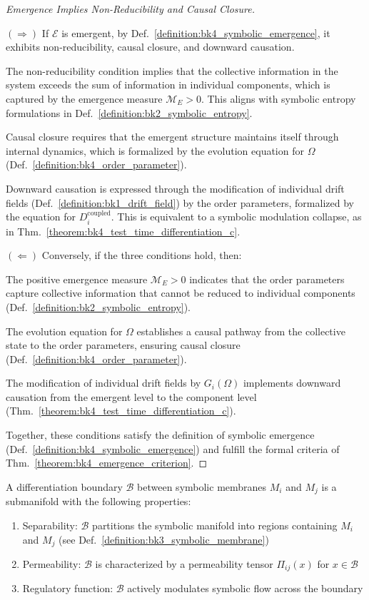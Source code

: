 \begin{proof}[Emergence Implies Non-Reducibility and Causal Closure]
\label{proof:bk4_emergence_conditions}
\leavevmode

$(\Rightarrow)$ If $\mathcal{E}$ is emergent, by Def.~\ref{definition:bk4_symbolic_emergence}, it exhibits non-reducibility, causal closure, and downward causation.

The non-reducibility condition implies that the collective information in the system exceeds the sum of information in individual components, which is captured by the emergence measure $\mathcal{M}_E > 0$.
This aligns with symbolic entropy formulations in Def.~\ref{definition:bk2_symbolic_entropy}.

Causal closure requires that the emergent structure maintains itself through internal dynamics, which is formalized by the evolution equation for $\Omega$ (Def.~\ref{definition:bk4_order_parameter}).

Downward causation is expressed through the modification of individual drift fields (Def.~\ref{definition:bk1_drift_field}) by the order parameters, formalized by the equation for $D_i^{\text{coupled}}$.
This is equivalent to a symbolic modulation collapse, as in Thm.~\ref{theorem:bk4_test_time_differentiation_c}.

$(\Leftarrow)$ Conversely, if the three conditions hold, then:

The positive emergence measure $\mathcal{M}_E > 0$ indicates that the order parameters capture collective information that cannot be reduced to individual components (Def.~\ref{definition:bk2_symbolic_entropy}).

The evolution equation for $\Omega$ establishes a causal pathway from the collective state to the order parameters, ensuring causal closure (Def.~\ref{definition:bk4_order_parameter}).

The modification of individual drift fields by $G_i(\Omega)$ implements downward causation from the emergent level to the component level (Thm.~\ref{theorem:bk4_test_time_differentiation_c}).

Together, these conditions satisfy the definition of symbolic emergence (Def.~\ref{definition:bk4_symbolic_emergence}) and fulfill the formal criteria of Thm.~\ref{theorem:bk4_emergence_criterion}.

\end{proof}
\begin{definition} \label{definition:bk4_differentiation_boundary}
A differentiation boundary $\mathcal{B}$ between symbolic membranes $M_i$ and $M_j$ is a submanifold with the following properties:
\begin{enumerate}
    \item Separability: $\mathcal{B}$ partitions the symbolic manifold into regions containing $M_i$ and $M_j$ (see Def.~\ref{definition:bk3_symbolic_membrane})
    \item Permeability: $\mathcal{B}$ is characterized by a permeability tensor $\Pi_{ij}(x)$ for $x \in \mathcal{B}$
    \item Regulatory function: $\mathcal{B}$ actively modulates symbolic flow across the boundary
\end{enumerate}
\end{definition}
